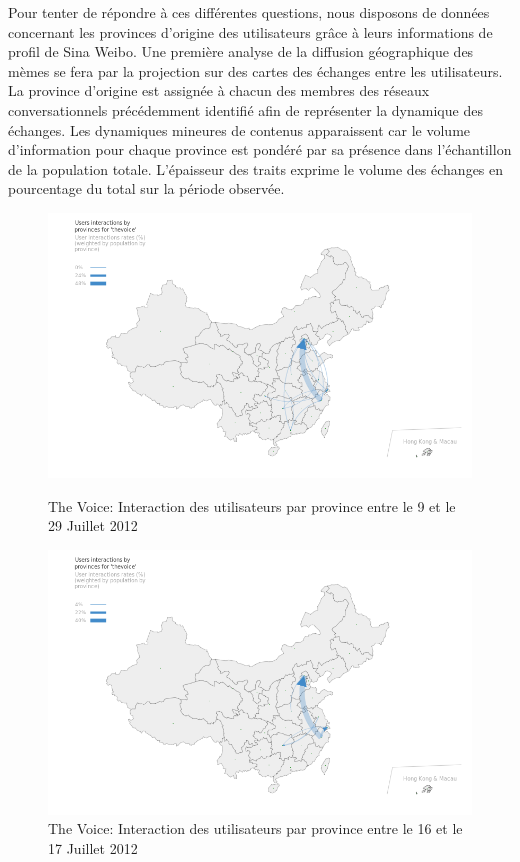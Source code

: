 Pour tenter de répondre \`a ces différentes questions, nous disposons de données concernant les provinces d{\textquoteright}origine des utilisateurs grâce à leurs informations de profil de Sina Weibo. Une première analyse de la diffusion géographique des mèmes se fera par la projection sur des cartes des échanges entre les utilisateurs. La province d'origine est assignée à chacun des membres des réseaux conversationnels précédemment identifié afin de représenter la dynamique des échanges. Les dynamiques mineures de contenus apparaissent car le volume d'information pour chaque province est pondéré par sa présence dans l'échantillon de la population totale. L{\textquoteright}épaisseur des traits exprime le volume des échanges en pourcentage du total sur la période observée.

\begin{figure}[htbp]
  \begin{minipage}[c]{.45\linewidth}
    \centering
    \includegraphics[scale=.3]{figures/chap4/chapitre4-img19.png}
    \caption{
      The Voice: Interaction des utilisateurs par province entre le 9 et le 29 Juillet 2012
    }
    \label{fig:geo-voice-t1}
  \end{minipage}
  \begin{minipage}[c]{.45\linewidth}
    \centering
    \includegraphics[scale=.3]{figures/chap4/chapitre4-img20.png}    
    \caption{
      The Voice: Interaction des utilisateurs par province entre le 16 et le 17 Juillet 2012
    }
    \label{fig:geo-voice-t2}
  \end{minipage}
\end{figure}

